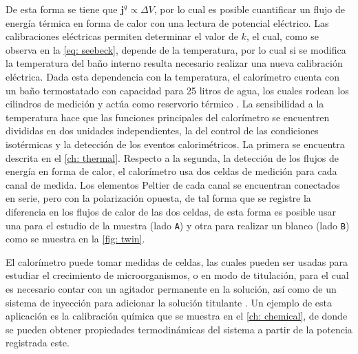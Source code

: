 	De esta forma se tiene que $\mathbf{j}^q \propto \Delta V$, por lo cual es posible cuantificar un flujo de energ\'ia t\'ermica en forma de calor con una lectura de potencial el\'ectrico. Las calibraciones el\'ectricas permiten determinar el valor de $k$, el cual, como se observa en la \autoref{eq: seebeck}, depende de la temperatura, por lo cual si se modifica la temperatura del ba\~no interno resulta necesario realizar una nueva calibraci\'on el\'ectrica. Dada esta dependencia con la temperatura, el calor\'imetro cuenta con un ba\~no termostatado con capacidad para 25 litros de agua, los cuales rodean los cilindros de medici\'on y act\'ua como reservorio t\'ermico \cite{Suurkuusk}. La sensibilidad a la temperatura hace que las funciones principales del calor\'imetro se encuentren divididas en dos unidades independientes, la del control de las condiciones isot\'ermicas y la detecci\'on de los eventos calorim\'etricos. La primera se encuentra descrita en el \autoref{ch: thermal}. Respecto a la segunda, la detecci\'on de los flujos de energ\'ia en forma de calor, el calor\'imetro usa dos celdas de medici\'on para cada canal de medida. Los elementos Peltier de cada canal se encuentran conectados en serie, pero con la polarizaci\'on opuesta, de tal forma que se registre la diferencia en los flujos de calor de las dos celdas, de esta forma es posible usar una para el estudio de la muestra (lado \texttt{A}) y otra para realizar un blanco (lado \texttt{B}) como se muestra en la \autoref{fig: twin}.
	 
	El calor\'imetro puede tomar medidas de celdas, las cuales pueden ser usadas para estudiar el crecimiento de microorganismos, o en modo de titulaci\'on, para el cual es necesario contar con un agitador permanente en la soluci\'on, as\'i como de un sistema de inyecci\'on para adicionar la soluci\'on titulante \cite{Suurkuusk}. Un ejemplo de esta aplicaci\'on es la calibraci\'on qu\'imica que se muestra en el \autoref{ch: chemical}, de donde se pueden obtener propiedades termodin\'amicas del sistema a partir de la potencia registrada este. 	 

